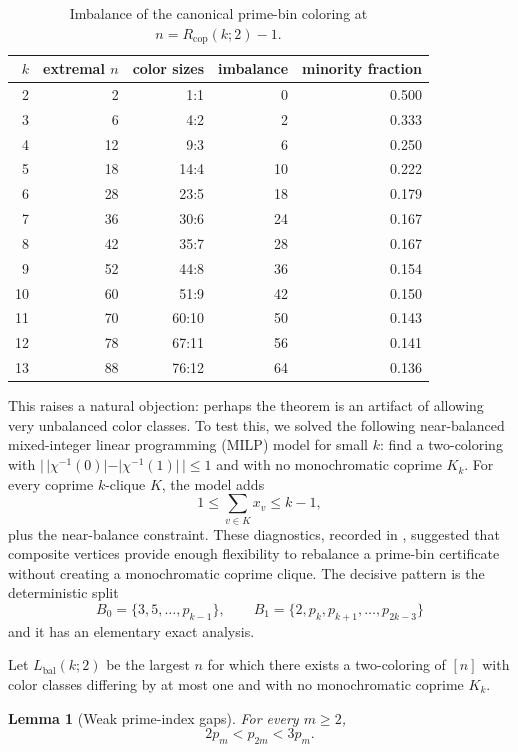 \documentclass[11pt]{article}
\theoremstyle{plain}
\newtheorem{lemma}[theorem]{Lemma}
\theoremstyle{definition}
\theoremstyle{remark}
\newcommand{\Rcop}{R_{\mathrm{cop}}}
\begin{document}
\begin{table}[htbp]
\centering
\caption{Imbalance of the canonical prime-bin coloring at $n=\Rcop(k;2)-1$.}
\label{tab:prime-bin-imbalance}
\begin{tabular}{rrrrr}
\toprule
$k$ & extremal $n$ & color sizes & imbalance & minority fraction \\
\midrule
2 & 2 & 1:1 & 0 & 0.500 \\
3 & 6 & 4:2 & 2 & 0.333 \\
4 & 12 & 9:3 & 6 & 0.250 \\
5 & 18 & 14:4 & 10 & 0.222 \\
6 & 28 & 23:5 & 18 & 0.179 \\
7 & 36 & 30:6 & 24 & 0.167 \\
8 & 42 & 35:7 & 28 & 0.167 \\
9 & 52 & 44:8 & 36 & 0.154 \\
10 & 60 & 51:9 & 42 & 0.150 \\
11 & 70 & 60:10 & 50 & 0.143 \\
12 & 78 & 67:11 & 56 & 0.141 \\
13 & 88 & 76:12 & 64 & 0.136 \\
\bottomrule
\end{tabular}

\end{table}

This raises a natural objection: perhaps the theorem is an artifact of
allowing very unbalanced color classes.  To test this, we solved the following
near-balanced mixed-integer linear programming (MILP) model for small $k$:
find a two-coloring with
$|\,|\chi^{-1}(0)|-|\chi^{-1}(1)|\,|\le 1$ and with no monochromatic
coprime $K_k$.  For every coprime $k$-clique $K$, the model adds
\[
  1 \le \sum_{v\in K} x_v \le k-1,
\]
plus the near-balance constraint.  These diagnostics, recorded in
, suggested that composite vertices provide enough
flexibility to rebalance a prime-bin certificate without creating a
monochromatic coprime clique.  The decisive pattern is the deterministic split
\[
  B_0=\{3,5,\ldots,p_{k-1}\},\qquad
  B_1=\{2,p_k,p_{k+1},\ldots,p_{2k-3}\}
\]
and it has an elementary exact analysis.

Let $L_{\mathrm{bal}}(k;2)$ be the largest $n$ for which there exists a
two-coloring of $[n]$ with color classes differing by at most one and with no
monochromatic coprime $K_k$.

\begin{lemma}[Weak prime-index gaps]
\label{lem:prime-index-gaps}
For every $m\ge2$,
\[
  2p_m<p_{2m}<3p_m .
\]
\end{lemma}
\end{document}
